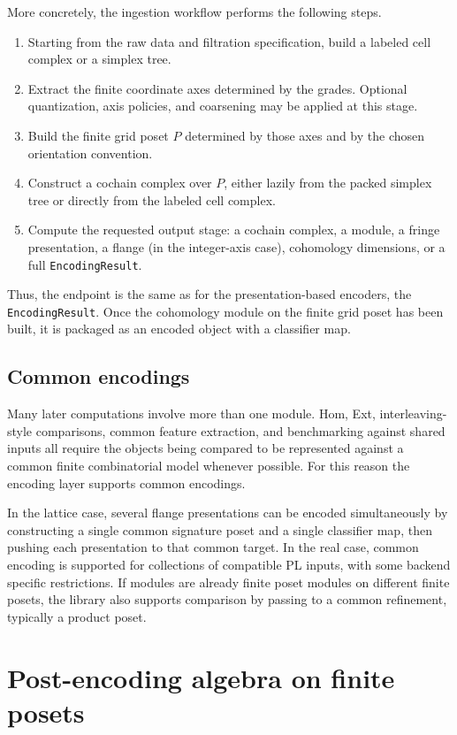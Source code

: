 \documentclass[11pt]{article}
\theoremstyle{definition}
\theoremstyle{remark}
\begin{document}
More concretely, the ingestion workflow performs the following steps.
\begin{enumerate}[label=(\roman*)]
	\item Starting from the raw data and filtration specification, build a labeled cell complex or a simplex tree.
	\item Extract the finite coordinate axes determined by the grades.  Optional quantization, axis policies, and coarsening may be applied at this stage.
	\item Build the finite grid poset $P$ determined by those axes and by the chosen orientation convention.
	\item Construct a cochain complex over $P$, either lazily from the packed simplex tree or directly from the labeled cell complex.
	\item Compute the requested output stage: a cochain complex, a module, a fringe presentation, a flange (in the integer-axis case), cohomology dimensions, or a full \texttt{EncodingResult}.
\end{enumerate}

Thus, the endpoint is the same as for the presentation-based encoders, the \texttt{EncodingResult}.  Once the cohomology module on the finite grid poset has been built, it is packaged as an encoded object with a classifier map.

\subsection{Common encodings}

Many later computations involve more than one module.  Hom, Ext, interleaving-style comparisons, common feature extraction, and benchmarking against shared inputs all require the objects being compared to be represented against a common finite combinatorial model whenever possible.  For this reason the encoding layer supports common encodings.

In the lattice case, several flange presentations can be encoded simultaneously by constructing a single common signature poset and a single classifier map, then pushing each presentation to that common target.  In the real case, common encoding is supported for collections of compatible PL inputs, with some backend specific restrictions.  If modules are already finite poset modules on different finite posets, the library also supports comparison by passing to a common refinement, typically a product poset.

\section{Post-encoding algebra on finite posets}\label{sec:post-encoding-algebra}
\end{document}
